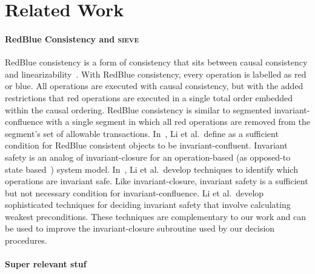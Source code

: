 \section{Related Work}

\newcommand{\sieve}{\textsc{sieve}}
\paragraph{RedBlue Consistency and \sieve}
RedBlue consistency is a form of consistency that sits between causal
consistency and linearizability~\cite{li2012making}. With RedBlue consistency,
every operation is labelled as red or blue. All operations are executed with
causal consistency, but with the added restrictions that red operations are
executed in a single total order embedded within the causal ordering.
RedBlue consistency is similar to segmented invariant-confluence with a single
segment in which all red operations are removed from the segment's set of
allowable transactions.  In~\cite{li2012making}, Li et al.\ define
 as a sufficient condition for RedBlue consistent
objects to be invariant-confluent.  Invariant safety is an analog of
invariant-closure for an operation-based (as opposed-to state
based~\cite{shapiro2011conflict}) system model.  In~\cite{li2014automating}, Li
et al.\ develop techniques to identify which operations are invariant safe.
Like invariant-closure, invariant safety is a sufficient but not necessary
condition for invariant-confluence. Li et al.\ develop sophisticated techniques
for deciding invariant safety that involve calculating weakest preconditions.
These techniques are complementary to our work and can be used to improve the
invariant-closure subroutine used by our decision procedures.

\paragraph{Super relevant stuf}




